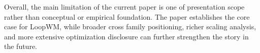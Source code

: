 \par
Overall, the main limitation of the current paper is one of presentation scope rather than conceptual or empirical foundation. The paper establishes the core case for LoopWM, while broader cross family positioning, richer scaling analysis, and more extensive optimization disclosure can further strengthen the story in the future.